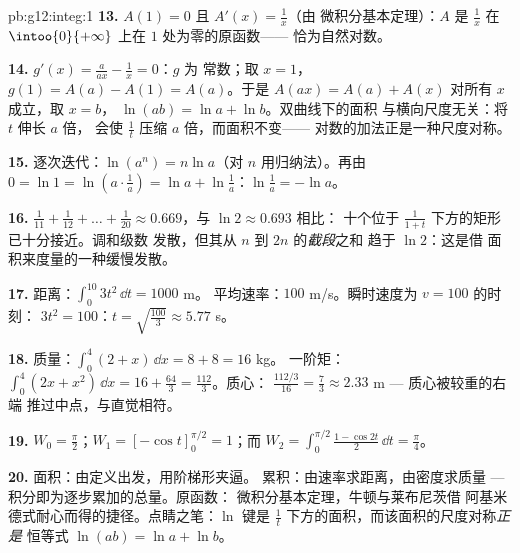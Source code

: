 \begin{solution}{pb:g12:integ:1}
\textbf{13.} $A(1) = 0$ 且 $A'(x) = \frac1x$（由
微积分基本定理）：$A$ 是 $\frac1x$ 在
$\intoo{0}{+\infty}$ 上在 $1$ 处为零的原函数——
恰为自然对数。

\textbf{14.} $g'(x) = \frac{a}{ax} - \frac1x = 0$：$g$ 为
常数；取 $x = 1$，$g(1) = A(a) - A(1) = A(a)$。于是
$A(ax) = A(a) + A(x)$ 对所有 $x$ 成立，取 $x = b$，
$\ln(ab) = \ln a + \ln b$。双曲线下的面积
与横向尺度无关：将 $t$ 伸长 $a$ 倍，
会使 $\frac1t$ 压缩 $a$ 倍，而面积不变——
对数的加法正是一种尺度对称。

\textbf{15.} 逐次迭代：$\ln(a^n) = n\ln a$（对
$n$ 用归纳法）。再由 $0 = \ln 1 = \ln\left(a \cdot \frac1a\right) =
\ln a + \ln\frac1a$：$\ln\frac1a = -\ln a$。

\textbf{16.} $\frac{1}{11} + \frac{1}{12} + \dots +
\frac{1}{20} \approx 0.669$，与 $\ln 2 \approx 0.693$ 相比：
十个位于 $\frac{1}{1+t}$ 下方的矩形已十分接近。调和级数
发散，但其从 $n$ 到 $2n$ 的\emph{截段}之和
趋于 $\ln 2$：这是借
面积来度量的一种缓慢发散。

\textbf{17.} 距离：$\int_0^{10} 3t^2\,\dd t = 1000$ m。
平均速率：$100$ m/s。瞬时速度为 $v = 100$ 的时刻：
$3t^2 = 100$：$t = \sqrt{\frac{100}{3}} \approx 5.77$ s。

\textbf{18.} 质量：$\int_0^4 (2 + x)\,\dd x = 8 + 8 = 16$ kg。
一阶矩：$\int_0^4 (2x + x^2)\,\dd x = 16 + \frac{64}{3} =
\frac{112}{3}$。质心：
$\frac{112/3}{16} = \frac73 \approx 2.33$ m --- 质心被较重的右端
推过中点，与直觉相符。

\textbf{19.} $W_0 = \frac\pi2$；$W_1 = \left[-\cos
t\right]_0^{\pi/2} = 1$；而
$W_2 = \int_0^{\pi/2} \frac{1 - \cos 2t}{2}\,\dd t =
\frac\pi4$。

\textbf{20.} 面积：由定义出发，用阶梯形夹逼。
累积：由速率求距离，由密度求质量 ---
积分即为逐步累加的总量。原函数：
微积分基本定理，牛顿与莱布尼茨借
阿基米德式耐心而得的捷径。点睛之笔：$\ln$ 键是
$\frac1t$ 下方的面积，而该面积的尺度对称\emph{正是}
恒等式 $\ln(ab) = \ln a + \ln b$。
\end{solution}
